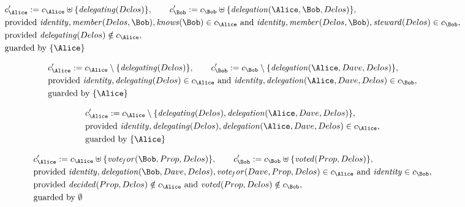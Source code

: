 \begin{align*}
&
c'_
{
\Alice
}
 := 
c_
{
\Alice
}
 \uplus 
\{
\mathit{
delegating
}
(
Delos
)
\}
, \qquad 
c'_
{
\Bob
}
 := 
c_
{
\Bob
}
 \uplus 
\{
\mathit{
delegation
}
(
\Alice
,
\Bob
,
Delos
)
\}
,\\
&
\text{provided } 
\mathit{
identity
}
,
\mathit{
member
}
(
Delos
,
\Bob
)
,
\mathit{
knows
}
(
\Bob
)
 \in c_
{
\Alice
}
 \text{ and } 
\mathit{
identity
}
,
\mathit{
member
}
(
Delos
,
\Bob
)
,
\mathit{
steward
}
(
Delos
)
 \in c_
{
\Bob
}
,\\
&
\text{provided } 
\mathit{
delegating
}
(
Delos
)
 \notin c_
{
\Alice
}
,\\
&
\text{guarded by } \{
\Alice
\}
\end{align*}

\begin{align*}
&
c'_
{
\Alice
}
 := 
c_
{
\Alice
}
 \setminus 
\{
\mathit{
delegating
}
(
Delos
)
\}
, \qquad 
c'_
{
\Bob
}
 := 
c_
{
\Bob
}
 \setminus 
\{
\mathit{
delegation
}
(
\Alice
,
Dave
,
Delos
)
\}
,\\
&
\text{provided } 
\mathit{
identity
}
,
\mathit{
delegating
}
(
Delos
)
 \in c_
{
\Alice
}
 \text{ and } 
\mathit{
identity
}
,
\mathit{
delegation
}
(
\Alice
,
Dave
,
Delos
)
 \in c_
{
\Bob
}
,\\
&
\text{guarded by } \{
\Alice
\}
\end{align*}

\begin{align*}
&
c'_
{
\Alice
}
 := 
c_
{
\Alice
}
 \setminus 
\{
\mathit{
delegating
}
(
Delos
)
,
\mathit{
delegation
}
(
\Alice
,
Dave
,
Delos
)
\}
,\\
&
\text{provided } 
\mathit{
identity
}
,
\mathit{
delegating
}
(
Delos
)
,
\mathit{
delegation
}
(
\Alice
,
Dave
,
Delos
)
 \in c_
{
\Alice
}
,\\
&
\text{guarded by } \{
\Alice
\}
\end{align*}

\begin{align*}
&
c'_
{
\Alice
}
 := 
c_
{
\Alice
}
 \uplus 
\{
\mathit{
vote_for
}
(
\Bob
,
Prop
,
Delos
)
\}
, \qquad 
c'_
{
\Bob
}
 := 
c_
{
\Bob
}
 \uplus 
\{
\mathit{
voted
}
(
Prop
,
Delos
)
\}
,\\
&
\text{provided } 
\mathit{
identity
}
,
\mathit{
delegation
}
(
\Bob
,
Dave
,
Delos
)
,
\mathit{
vote_for
}
(
Dave
,
Prop
,
Delos
)
 \in c_
{
\Alice
}
 \text{ and } 
\mathit{
identity
}
 \in c_
{
\Bob
}
,\\
&
\text{provided } 
\mathit{
decided
}
(
Prop
,
Delos
)
 \notin c_
{
\Alice
}
 \text{ and } 
\mathit{
voted
}
(
Prop
,
Delos
)
 \notin c_
{
\Bob
}
,\\
&
\text{guarded by } \emptyset
\end{align*}
